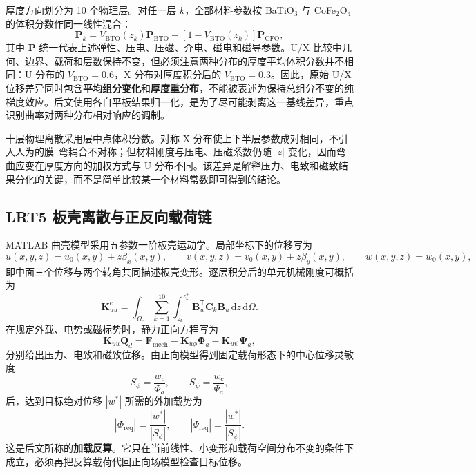 \documentclass[UTF8,fontset=windows,11pt,a4paper]{ctexart}
\begin{document}
厚度方向划分为 10 个物理层。对任一层 $k$，全部材料参数按 BaTiO$_3$ 与 CoFe$_2$O$_4$ 的体积分数作同一线性混合：
\[
\mathbf P_k
=V_{\mathrm{BTO}}(z_k)\mathbf P_{\mathrm{BTO}}
+\left[1-V_{\mathrm{BTO}}(z_k)\right]\mathbf P_{\mathrm{CFO}},
\]
其中 $\mathbf P$ 统一代表上述弹性、压电、压磁、介电、磁电和磁导参数。U/X 比较中几何、边界、载荷和层数保持不变，但必须注意两种分布的厚度平均体积分数并不相同：U 分布的 $\overline V_{\mathrm{BTO}}=0.6$，X 分布对厚度积分后的 $\overline V_{\mathrm{BTO}}=0.3$。因此，原始 U/X 位移差异同时包含\textbf{平均组分变化}和\textbf{厚度重分布}，不能被表述为保持总组分不变的纯梯度效应。后文使用各自平板结果归一化，是为了尽可能剥离这一基线差异，重点识别曲率对两种分布相对响应的调制。

十层物理离散采用层中点体积分数。对称 X 分布使上下半层参数成对相同，不引入人为的膜--弯耦合不对称；但材料刚度与压电、压磁系数仍随 $|z|$ 变化，因而弯曲应变在厚度方向的加权方式与 U 分布不同。该差异是解释压力、电致和磁致结果分化的关键，而不是简单比较某一个材料常数即可得到的结论。

\subsection{LRT5 板壳离散与正反向载荷链}

MATLAB 曲壳模型采用五参数一阶板壳运动学。局部坐标下的位移写为
\[
u(x,y,z)=u_0(x,y)+z\beta_x(x,y),\qquad
v(x,y,z)=v_0(x,y)+z\beta_y(x,y),\qquad
w(x,y,z)=w_0(x,y),
\]
即中面三个位移与两个转角共同描述板壳变形。逐层积分后的单元机械刚度可概括为
\[
\mathbf K_{uu}^{e}
=\int_{\Omega_e}\sum_{k=1}^{10}
  \int_{z_k^-}^{z_k^+}
  \mathbf B_u^{\mathsf T}\mathbf C_k\mathbf B_u
  \,\mathrm dz\,\mathrm d\Omega .
\]
在规定外载、电势或磁标势时，静力正向方程写为
\[
\mathbf K_{uu}\mathbf Q_d
=\mathbf F_{\mathrm{mech}}
-\mathbf K_{u\phi}\boldsymbol\Phi_a
-\mathbf K_{u\psi}\boldsymbol\Psi_a,
\]
分别给出压力、电致和磁致位移。由正向模型得到固定载荷形态下的中心位移灵敏度
\[
S_\phi=\frac{w_c}{\Phi_a},\qquad
S_\psi=\frac{w_c}{\Psi_a},
\]
后，达到目标绝对位移 $|w^*|$ 所需的外加载势为
\[
|\Phi_{\mathrm{req}}|=\frac{|w^*|}{|S_\phi|},\qquad
|\Psi_{\mathrm{req}}|=\frac{|w^*|}{|S_\psi|}.
\]
这是后文所称的\textbf{加载反算}。它只在当前线性、小变形和载荷空间分布不变的条件下成立，必须再把反算载荷代回正向场模型检查目标位移。
\end{document}
